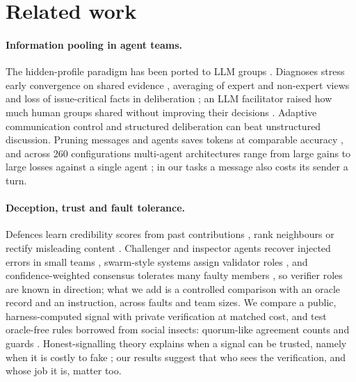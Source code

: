 \documentclass{article}
\begin{document}
\section{Related work}

\paragraph{Information pooling in agent teams.} The hidden-profile paradigm \citep{stasser1985pooling} has been ported to LLM groups \citep{li2026hiddenbench,anthropic2026redteam}. Diagnoses stress early convergence on shared evidence \citep{li2026hiddenbench}, averaging of expert and non-expert views \citep{pappu2026experts} and loss of issue-critical facts in deliberation \citep{wan2026deliberative}; an LLM facilitator raised how much human groups shared without improving their decisions \citep{alsobay2026table}. Adaptive communication control \citep{babu2026consilience} and structured deliberation \citep{prakash2026dci} can beat unstructured discussion. Pruning messages and agents saves tokens at comparable accuracy \citep{zhang2024agentprune,wang2025agentdropout}, and across 260 configurations multi-agent architectures range from large gains to large losses against a single agent \citep{kim2025scaling}; in our tasks a message also costs its sender a turn.

\paragraph{Deception, trust and fault tolerance.} Defences learn credibility scores from past contributions \citep{ebrahimi2025credibility}, rank neighbours \citep{feng2026sentinelnet} or rectify misleading content \citep{luo2026star}. Challenger and inspector agents recover injected errors in small teams \citep{huang2024faulty}, swarm-style systems assign validator roles \citep{li2025swarmsys}, and confidence-weighted consensus tolerates many faulty members \citep{zheng2026cpwbft}, so verifier roles are known in direction; what we add is a controlled comparison with an oracle record and an instruction, across faults and team sizes. We compare a public, harness-computed signal with private verification at matched cost, and test oracle-free rules borrowed from social insects: quorum-like agreement counts \citep{seeley2010honeybee} and guards \citep{breed2004defensive}. Honest-signalling theory explains when a signal can be trusted, namely when it is costly to fake \citep{zahavi1975handicap}; our results suggest that who sees the verification, and whose job it is, matter too.
\end{document}
